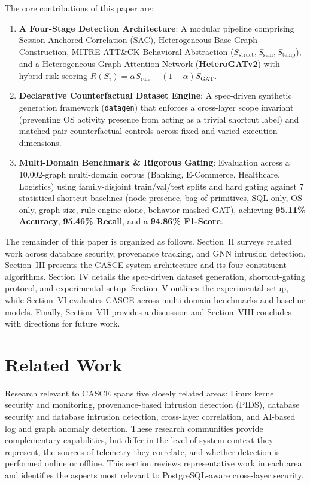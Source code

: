 \documentclass[conference]{IEEEtran}
\begin{document}
The core contributions of this paper are:
\begin{enumerate}[leftmargin=*,itemsep=1pt,topsep=2pt]
\item \textbf{A Four-Stage Detection Architecture}: A modular pipeline comprising Session-Anchored Correlation (SAC), Heterogeneous Base Graph Construction, MITRE ATT\&CK Behavioral Abstraction ($S_{\text{struct}}, S_{\text{sem}}, S_{\text{temp}}$), and a Heterogeneous Graph Attention Network (\textbf{HeteroGATv2}) with hybrid risk scoring $R(S_i) = \alpha S_{\text{rule}} + (1-\alpha) S_{\text{GAT}}$.

\item \textbf{Declarative Counterfactual Dataset Engine}: A spec-driven synthetic generation framework (\texttt{datagen}) that enforces a cross-layer scope invariant (preventing OS activity presence from acting as a trivial shortcut label) and matched-pair counterfactual controls across fixed and varied execution dimensions.

\item \textbf{Multi-Domain Benchmark \& Rigorous Gating}: Evaluation across a 10,002-graph multi-domain corpus (Banking, E-Commerce, Healthcare, Logistics) using family-disjoint train/val/test splits and hard gating against 7 statistical shortcut baselines (node presence, bag-of-primitives, SQL-only, OS-only, graph size, rule-engine-alone, behavior-masked GAT), achieving \textbf{95.11\% Accuracy}, \textbf{95.46\% Recall}, and a \textbf{94.86\% F1-Score}.
\end{enumerate}

The remainder of this paper is organized as follows. Section~II surveys related work across database security, provenance tracking, and GNN intrusion detection. Section~III presents the CASCE system architecture and its four constituent algorithms. Section~IV details the spec-driven dataset generation, shortcut-gating protocol, and experimental setup. Section~V outlines the experimental setup, while Section~VI evaluates CASCE across multi-domain benchmarks and baseline models. Finally, Section~VII provides a discussion and Section~VIII concludes with directions for future work.

\section{Related Work}

Research relevant to CASCE spans five closely related areas: Linux kernel security and monitoring, provenance-based intrusion detection (PIDS), database security and database intrusion detection, cross-layer correlation, and AI-based log and graph anomaly detection. These research communities provide complementary capabilities, but differ in the level of system context they represent, the sources of telemetry they correlate, and whether detection is performed online or offline. This section reviews representative work in each area and identifies the aspects most relevant to PostgreSQL-aware cross-layer security.
\end{document}
